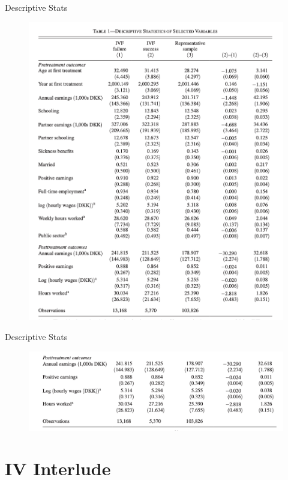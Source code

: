 \documentclass[11pt,notes=hide,aspectratio=169,mathserif]{beamer}
\begin{document}
\begin{frame}{Descriptive Stats}
  \begin{figure}
    \centering
    \includegraphics[width=0.8\linewidth]{inputs/ivf2.png}
    \end{figure}
\end{frame}
\begin{frame}{Descriptive Stats}
  \begin{figure}
    \centering
    \includegraphics[width=0.8\linewidth]{inputs/ivf3.png}
    \end{figure}
\end{frame}


\section{IV Interlude}
\end{document}
